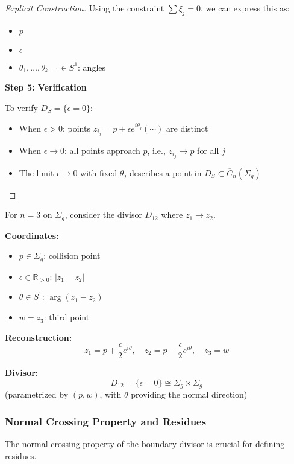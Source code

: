 \begin{proof}[Explicit Construction]
Using the constraint $\sum \xi_j = 0$, we can express this as:
\begin{itemize}
\item $p$
\item $\epsilon$
\item $\theta_1, \ldots, \theta_{k-1} \in S^1$: angles
\end{itemize}

\medskip
\noindent\textbf{Step 5: Verification}

To verify $D_S = \{\epsilon = 0\}$:
\begin{itemize}
\item When $\epsilon > 0$: points $z_{i_j} = p + \epsilon e^{i\theta_j} (\cdots)$ are distinct
\item When $\epsilon \to 0$: all points approach $p$, i.e., $z_{i_j} \to p$ for all $j$
\item The limit $\epsilon \to 0$ with fixed $\theta_j$ describes a point in $D_S \subset \overline{C}_n(\Sigma_g)$
\end{itemize}
\end{proof}

\begin{example}\label{ex:three-points-coords}
For $n=3$ on $\Sigma_g$, consider the divisor $D_{12}$ where $z_1 \to z_2$.

\textbf{Coordinates:}
\begin{itemize}
\item $p \in \Sigma_g$: collision point
\item $\epsilon \in \mathbb{R}_{>0}$: $|z_1 - z_2|$
\item $\theta \in S^1$: $\arg(z_1 - z_2)$
\item $w = z_3$: third point
\end{itemize}

\textbf{Reconstruction:}
$$z_1 = p + \frac{\epsilon}{2}e^{i\theta}, \quad z_2 = p - \frac{\epsilon}{2}e^{i\theta}, \quad z_3 = w$$

\textbf{Divisor:}
$$D_{12} = \{\epsilon = 0\} \cong \Sigma_g \times \Sigma_g$$
(parametrized by $(p,w)$, with $\theta$ providing the normal direction)
\end{example}

\subsubsection{Normal Crossing Property and Residues}

The normal crossing property of the boundary divisor is crucial for defining residues.


